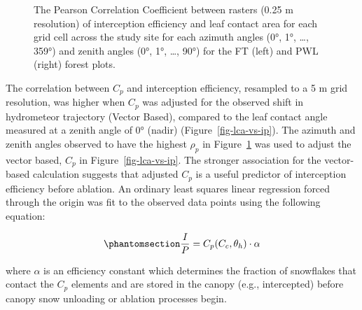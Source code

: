 \documentclass[
  letterpaper,
  DIV=11,
  numbers=noendperiod]{scrartcl}
\begin{document}
\begin{figure}[H]


\caption{\label{fig-hemi-ip-cc}The Pearson Correlation Coefficient
between rasters (0.25 m resolution) of interception efficiency and leaf
contact area for each grid cell across the study site for each azimuth
angles (0°, 1°, \ldots, 359°) and zenith angles (0°, 1°, \ldots, 90°)
for the FT (left) and PWL (right) forest plots.}

\end{figure}%

The correlation between \(C_p\) and interception efficiency, resampled
to a 5 m grid resolution, was higher when \(C_p\) was adjusted for the
observed shift in hydrometeor trajectory (Vector Based), compared to the
leaf contact angle measured at a zenith angle of 0° (nadir)
(Figure~\ref{fig-lca-vs-ip}). The azimuth and zenith angles observed to
have the highest \(\rho_p\) in Figure~\ref{fig-hemi-ip-cc} was used to
adjust the vector based, \(C_p\) in Figure~\ref{fig-lca-vs-ip}. The
stronger association for the vector-based calculation suggests that
adjusted \(C_p\) is a useful predictor of interception efficiency before
ablation. An ordinary least squares linear regression forced through the
origin was fit to the observed data points using the following equation:

\begin{equation}\phantomsection\label{eq-lca-ip}{
  \frac{I}{P} = C_p(C_c, \theta_h) \cdot \alpha
}\end{equation}

where \(\alpha\) is an efficiency constant which determines the fraction
of snowflakes that contact the \(C_p\) elements and are stored in the
canopy (e.g., intercepted) before canopy snow unloading or ablation
processes begin.
\end{document}
